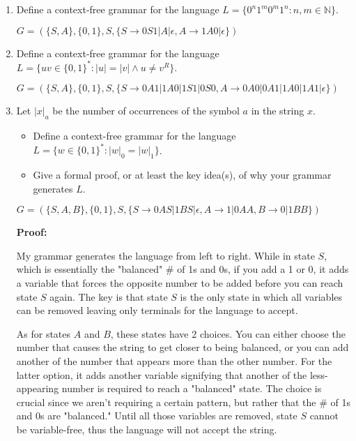 \documentclass[12pt]{article}
\begin{document}
\begin{enumerate}
\item Define a context-free grammar for the language $L = \{0^n1^m0^m1^n : n, m \in \mathbb{N}\}$.

\color{blue} $G = (\{S, A\}, \{0, 1\}, S, \{S \rightarrow 0S1|A|\epsilon, A \rightarrow 1A0|\epsilon\})$ \color{black}



\item Define a context-free grammar for the language $L = \{uv \in \{0,1\}^* : |u| = |v| \wedge u \neq v^R\}$.

\color{blue} $G = (\{S, A\}, \{0, 1\}, S, \{S \rightarrow 0A1 | 1A0 | 1S1 | 0S0, A \rightarrow 0A0 | 0A1 | 1A0 | 1A1 | \epsilon\})$ \color{black}



\item Let $|x|_a$ be the number of occurrences of the symbol $a$ in the string $x$.
\begin{itemize}
    \item Define a context-free grammar for the language $L = \{w \in \{0,1\}^* : |w|_0 = |w|_1\}$.
    \item Give a formal proof, or at least the key idea(s), of why your grammar generates $L$.
\end{itemize}

\color{blue}
    $G = (\{S, A, B\}, \{0, 1\}, S, \{S \rightarrow 0AS | 1BS | \epsilon, A \rightarrow 1 | 0AA, B \rightarrow 0 | 1BB\})$

    \textbf{Proof:}
    
    \quad My grammar generates the language from left to right. While in state $S$, which is essentially the "balanced" \# of 1s and 0s, if you add a 1 or 0, it adds a variable that forces the opposite number to be added before you can reach state $S$ again. The key is that state $S$ is the only state in which all variables can be removed leaving only terminals for the language to accept.
    
    \quad As for states $A$ and $B$, these states have 2 choices. You can either choose the number that causes the string to get closer to being balanced, or you can add another of the number that appears more than the other number. For the latter option, it adds another variable signifying that another of the less-appearing number is required to reach a "balanced" state. The choice is crucial since we aren't requiring a certain pattern, but rather that the \# of 1s and 0s are "balanced." Until all those variables are removed, state $S$ cannot be variable-free, thus the language will not accept the string.
\color{black}


\end{enumerate}
\end{document}
